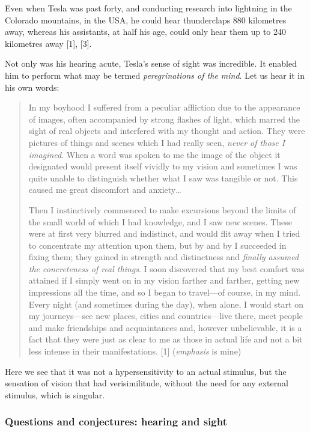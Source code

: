 \documentclass[
  12pt,
  british,
  a4paper,
]{article}
\begin{document}
Even when Tesla was past forty, and conducting research into lightning
in the Colorado mountains, in the USA, he could hear thunderclaps 880
kilometres away, whereas his assistants, at half his age, could only
hear them up to 240 kilometres away {[}1{]}, {[}3{]}.

Not only was his hearing acute, Tesla's sense of sight was incredible.
It enabled him to perform what may be termed \emph{peregrinations of the
mind}. Let us hear it in his own words:

\begin{quote}
In my boyhood I suffered from a peculiar affliction due to the
appearance of images, often accompanied by strong flashes of light,
which marred the sight of real objects and interfered with my thought
and action. They were pictures of things and scenes which I had really
seen, \emph{never of those I imagined}. When a word was spoken to me the
image of the object it designated would present itself vividly to my
vision and sometimes I was quite unable to distinguish whether what I
saw was tangible or not. This caused me great discomfort and
anxiety\ldots{}

Then I instinctively commenced to make excursions beyond the limits of
the small world of which I had knowledge, and I saw new scenes. These
were at first very blurred and indistinct, and would flit away when I
tried to concentrate my attention upon them, but by and by I succeeded
in fixing them; they gained in strength and distinctness and
\emph{finally assumed the concreteness of real things}. I soon
discovered that my best comfort was attained if I simply went on in my
vision farther and farther, getting new impressions all the time, and so
I began to travel---of course, in my mind. Every night (and sometimes
during the day), when alone, I would start on my journeys---see new
places, cities and countries---live there, meet people and make
friendships and acquaintances and, however unbelievable, it is a fact
that they were just as clear to me as those in actual life and not a bit
less intense in their manifestations. {[}1{]} (\emph{emphasis} is mine)
\end{quote}

Here we see that it was not a hypersensitivity to an actual stimulus,
but the sensation of vision that had verisimilitude, without the need
for any external stimulus, which is singular.

\hypertarget{questions-and-conjectures-hearing-and-sight}{%
\subsubsection{Questions and conjectures: hearing and
sight}\label{questions-and-conjectures-hearing-and-sight}}
\end{document}
